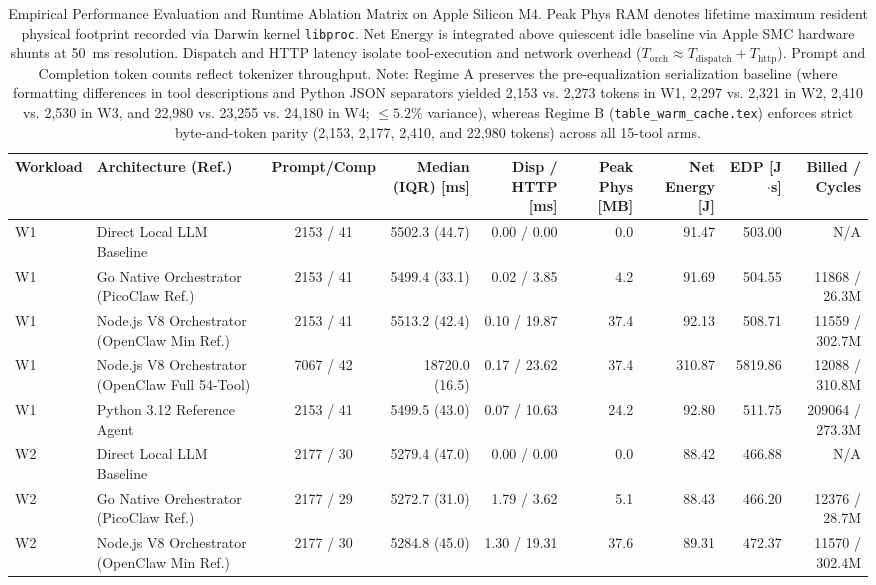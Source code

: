 \begin{table}[t]
\centering
\caption{Empirical Performance Evaluation and Runtime Ablation Matrix on Apple Silicon M4. Peak Phys RAM denotes lifetime maximum resident physical footprint recorded via Darwin kernel \texttt{libproc}. Net Energy is integrated above quiescent idle baseline via Apple SMC hardware shunts at 50~ms resolution. Dispatch and HTTP latency isolate tool-execution and network overhead ($T_{\text{orch}} \approx T_{\text{dispatch}} + T_{\text{http}}$). Prompt and Completion token counts reflect tokenizer throughput. Note: Regime A preserves the pre-equalization serialization baseline (where formatting differences in tool descriptions and Python JSON separators yielded 2,153 vs. 2,273 tokens in W1, 2,297 vs. 2,321 in W2, 2,410 vs. 2,530 in W3, and 22,980 vs. 23,255 vs. 24,180 in W4; $\le 5.2\%$ variance), whereas Regime B (\texttt{table\_warm\_cache.tex}) enforces strict byte-and-token parity (2,153, 2,177, 2,410, and 22,980 tokens) across all 15-tool arms.}
\label{tab:evaluation_ablation_m4}
\small
\begin{tabular}{l l c r r r r r r}
\hline
\textbf{Workload} & \textbf{Architecture (Ref.)} & \textbf{Prompt/Comp} & \textbf{Median (IQR) [ms]} & \textbf{Disp / HTTP [ms]} & \textbf{Peak Phys [MB]} & \textbf{Net Energy [J]} & \textbf{EDP [J$\cdot$s]} & \textbf{Billed / Cycles} \\
\hline
W1 & Direct Local LLM Baseline & 2153 / 41 & 5502.3 (44.7) & 0.00 / 0.00 & 0.0 & 91.47 & 503.00 & N/A \\
W1 & Go Native Orchestrator (PicoClaw Ref.) & 2153 / 41 & 5499.4 (33.1) & 0.02 / 3.85 & 4.2 & 91.69 & 504.55 & 11868 / 26.3M \\
W1 & Node.js V8 Orchestrator (OpenClaw Min Ref.) & 2153 / 41 & 5513.2 (42.4) & 0.10 / 19.87 & 37.4 & 92.13 & 508.71 & 11559 / 302.7M \\
W1 & Node.js V8 Orchestrator (OpenClaw Full 54-Tool) & 7067 / 42 & 18720.0 (16.5) & 0.17 / 23.62 & 37.4 & 310.87 & 5819.86 & 12088 / 310.8M \\
W1 & Python 3.12 Reference Agent & 2153 / 41 & 5499.5 (43.0) & 0.07 / 10.63 & 24.2 & 92.80 & 511.75 & 209064 / 273.3M \\
\hline
W2 & Direct Local LLM Baseline & 2177 / 30 & 5279.4 (47.0) & 0.00 / 0.00 & 0.0 & 88.42 & 466.88 & N/A \\
W2 & Go Native Orchestrator (PicoClaw Ref.) & 2177 / 29 & 5272.7 (31.0) & 1.79 / 3.62 & 5.1 & 88.43 & 466.20 & 12376 / 28.7M \\
W2 & Node.js V8 Orchestrator (OpenClaw Min Ref.) & 2177 / 30 & 5284.8 (45.0) & 1.30 / 19.31 & 37.6 & 89.31 & 472.37 & 11570 / 302.4M \\

\end{tabular}
\end{table}
